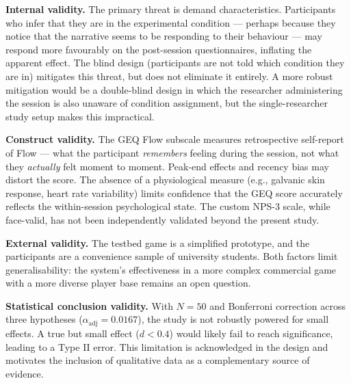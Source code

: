 \textbf{Internal validity.} The primary threat is demand characteristics. Participants who infer that they are in the experimental condition --- perhaps because they notice that the narrative seems to be responding to their behaviour --- may respond more favourably on the post-session questionnaires, inflating the apparent effect. The blind design (participants are not told which condition they are in) mitigates this threat, but does not eliminate it entirely. A more robust mitigation would be a double-blind design in which the researcher administering the session is also unaware of condition assignment, but the single-researcher study setup makes this impractical.

\textbf{Construct validity.} The GEQ Flow subscale measures retrospective self-report of Flow --- what the participant \textit{remembers} feeling during the session, not what they \textit{actually} felt moment to moment. Peak-end effects and recency bias may distort the score. The absence of a physiological measure (e.g., galvanic skin response, heart rate variability) limits confidence that the GEQ score accurately reflects the within-session psychological state. The custom NPS-3 scale, while face-valid, has not been independently validated beyond the present study.

\textbf{External validity.} The testbed game is a simplified prototype, and the participants are a convenience sample of university students. Both factors limit generalisability: the system's effectiveness in a more complex commercial game with a more diverse player base remains an open question.

\textbf{Statistical conclusion validity.} With $N = 50$ and Bonferroni correction across three hypotheses ($\alpha_{\text{adj}} = 0.0167$), the study is not robustly powered for small effects. A true but small effect ($d < 0.4$) would likely fail to reach significance, leading to a Type II error. This limitation is acknowledged in the design and motivates the inclusion of qualitative data as a complementary source of evidence.
